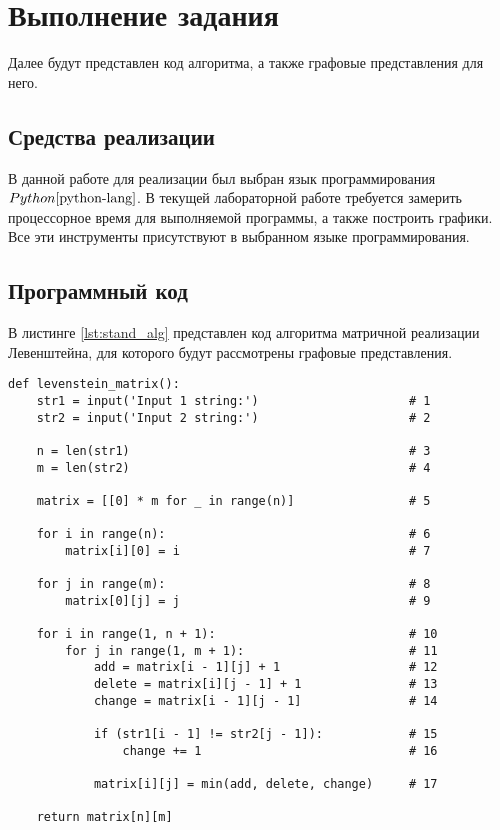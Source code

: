 \chapter{Выполнение задания}

Далее будут представлен код алгоритма, а также графовые представления для него.

\section{Средства реализации}
В данной работе для реализации был выбран язык программирования $Python \cite{python-lang}$. В текущей лабораторной работе требуется замерить процессорное время для выполняемой программы, а также построить графики. Все эти инструменты присутствуют в выбранном языке программирования.

\section{Программный код}

В листинге \ref{lst:stand_alg} представлен код алгоритма матричной реализации Левенштейна, для которого будут рассмотрены графовые представления.

\clearpage

\begin{center}
    \captionsetup{justification=raggedright,singlelinecheck=off}
    \begin{lstlisting}[label=lst:stand_alg,caption=Матричный алгоритм Левенштейна]
def levenstein_matrix():
    str1 = input('Input 1 string:')                     # 1
    str2 = input('Input 2 string:')                     # 2

    n = len(str1)                                       # 3
    m = len(str2)                                       # 4

    matrix = [[0] * m for _ in range(n)]                # 5

    for i in range(n):                                  # 6
        matrix[i][0] = i                                # 7
    
    for j in range(m):                                  # 8
        matrix[0][j] = j                                # 9

    for i in range(1, n + 1):                           # 10
        for j in range(1, m + 1):                       # 11
            add = matrix[i - 1][j] + 1                  # 12
            delete = matrix[i][j - 1] + 1               # 13
            change = matrix[i - 1][j - 1]               # 14
            
            if (str1[i - 1] != str2[j - 1]):            # 15
                change += 1                             # 16

            matrix[i][j] = min(add, delete, change)     # 17

    return matrix[n][m]

\end{lstlisting}
\end{center}


